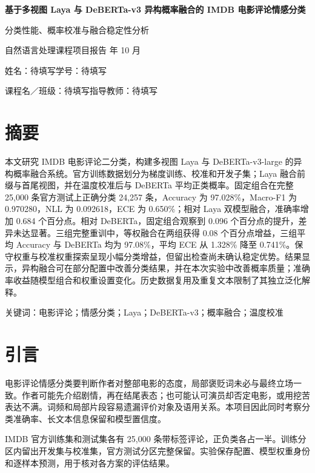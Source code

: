 \documentclass[UTF8,fontset=fandol,a4paper,11pt]{ctexart}
\begin{document}
\begin{center}
{\LARGE\bfseries 基于多视图 Laya 与 DeBERTa-v3 异构概率融合的 IMDB 电影评论情感分类}\par
\vspace{7pt}
{\normalsize 分类性能、概率校准与融合稳定性分析}\par
\vspace{5pt}
{\small 自然语言处理课程项目报告 年 10 月}\par
\vspace{5pt}
{\small 姓名：待填写\qquad 学号：待填写}\par
{\small 课程名／班级：待填写\qquad 指导教师：待填写}
\end{center}
\vspace{4pt}

\section*{摘要}
本文研究 IMDB 电影评论二分类，构建多视图 Laya 与 DeBERTa-v3-large 的异构概率融合系统。官方训练数据划分为梯度训练、校准和开发子集；Laya 融合前缀与首尾视图，并在温度校准后与 DeBERTa 平均正类概率。固定组合在完整 25,000 条官方测试上正确分类 24,257 条，Accuracy 为 97.028\%，Macro-F1 为 0.970280，NLL 为 0.092618，ECE 为 0.650\%；相对 Laya 双模型融合，准确率增加 0.684 个百分点。相对 DeBERTa，固定组合观察到 0.096 个百分点的提升，差异未达显著。三组完整重训中，等权融合在两组获得 0.08 个百分点增益，三组平均 Accuracy 与 DeBERTa 均为 97.08\%，平均 ECE 从 1.328\% 降至 0.741\%。保守权重与校准权重探索呈现小幅分类增益，但留出检查尚未确认稳定优势。结果显示，异构融合可在部分配置中改善分类结果，并在本次实验中改善概率质量；准确率收益随模型组合和权重设置变化。历史数据复用及重复文本限制了其独立泛化解释。

关键词：电影评论；情感分类；Laya；DeBERTa-v3；概率融合；温度校准

\section{引言}
电影评论情感分类要判断作者对整部电影的态度，局部褒贬词未必与最终立场一致。作者可能先介绍剧情，再在结尾表态；也可能认可演员却否定电影，或用挖苦表达不满。词频和局部片段容易遗漏评价对象及语用关系。本项目因此同时考察分类准确率、长文本信息保留和模型置信度。

IMDB 官方训练集和测试集各有 25,000 条带标签评论，正负类各占一半\cite{maas}。训练分区内留出开发集与校准集，官方测试分区完整保留。实验保存配置、模型权重身份和逐样本预测，用于核对各方案的评估结果。
\end{document}
